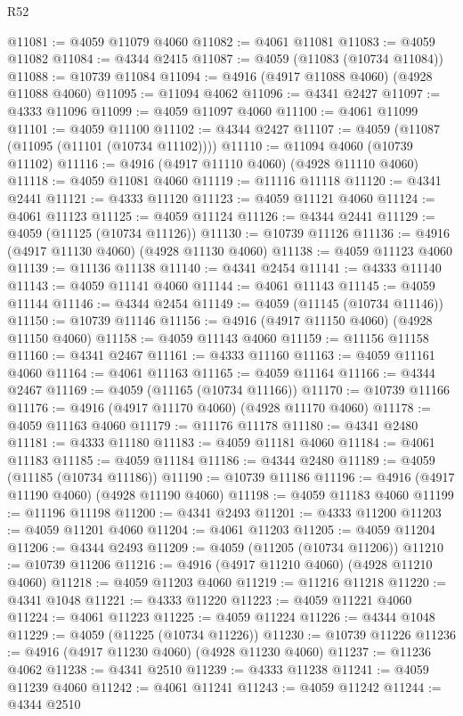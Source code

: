 \begin{lexlean}{R52}
\begin{coremodule}
@11081 := @4059 @11079 @4060
@11082 := @4061 @11081
@11083 := @4059 @11082
@11084 := @4344 @2415
@11087 := @4059 (@11083 (@10734 @11084))
@11088 := @10739 @11084
@11094 := @4916 (@4917 @11088 @4060) (@4928 @11088 @4060)
@11095 := @11094 @4062
@11096 := @4341 @2427
@11097 := @4333 @11096
@11099 := @4059 @11097 @4060
@11100 := @4061 @11099
@11101 := @4059 @11100
@11102 := @4344 @2427
@11107 := @4059 (@11087 (@11095 (@11101 (@10734 @11102))))
@11110 := @11094 @4060 (@10739 @11102)
@11116 := @4916 (@4917 @11110 @4060) (@4928 @11110 @4060)
@11118 := @4059 @11081 @4060
@11119 := @11116 @11118
@11120 := @4341 @2441
@11121 := @4333 @11120
@11123 := @4059 @11121 @4060
@11124 := @4061 @11123
@11125 := @4059 @11124
@11126 := @4344 @2441
@11129 := @4059 (@11125 (@10734 @11126))
@11130 := @10739 @11126
@11136 := @4916 (@4917 @11130 @4060) (@4928 @11130 @4060)
@11138 := @4059 @11123 @4060
@11139 := @11136 @11138
@11140 := @4341 @2454
@11141 := @4333 @11140
@11143 := @4059 @11141 @4060
@11144 := @4061 @11143
@11145 := @4059 @11144
@11146 := @4344 @2454
@11149 := @4059 (@11145 (@10734 @11146))
@11150 := @10739 @11146
@11156 := @4916 (@4917 @11150 @4060) (@4928 @11150 @4060)
@11158 := @4059 @11143 @4060
@11159 := @11156 @11158
@11160 := @4341 @2467
@11161 := @4333 @11160
@11163 := @4059 @11161 @4060
@11164 := @4061 @11163
@11165 := @4059 @11164
@11166 := @4344 @2467
@11169 := @4059 (@11165 (@10734 @11166))
@11170 := @10739 @11166
@11176 := @4916 (@4917 @11170 @4060) (@4928 @11170 @4060)
@11178 := @4059 @11163 @4060
@11179 := @11176 @11178
@11180 := @4341 @2480
@11181 := @4333 @11180
@11183 := @4059 @11181 @4060
@11184 := @4061 @11183
@11185 := @4059 @11184
@11186 := @4344 @2480
@11189 := @4059 (@11185 (@10734 @11186))
@11190 := @10739 @11186
@11196 := @4916 (@4917 @11190 @4060) (@4928 @11190 @4060)
@11198 := @4059 @11183 @4060
@11199 := @11196 @11198
@11200 := @4341 @2493
@11201 := @4333 @11200
@11203 := @4059 @11201 @4060
@11204 := @4061 @11203
@11205 := @4059 @11204
@11206 := @4344 @2493
@11209 := @4059 (@11205 (@10734 @11206))
@11210 := @10739 @11206
@11216 := @4916 (@4917 @11210 @4060) (@4928 @11210 @4060)
@11218 := @4059 @11203 @4060
@11219 := @11216 @11218
@11220 := @4341 @1048
@11221 := @4333 @11220
@11223 := @4059 @11221 @4060
@11224 := @4061 @11223
@11225 := @4059 @11224
@11226 := @4344 @1048
@11229 := @4059 (@11225 (@10734 @11226))
@11230 := @10739 @11226
@11236 := @4916 (@4917 @11230 @4060) (@4928 @11230 @4060)
@11237 := @11236 @4062
@11238 := @4341 @2510
@11239 := @4333 @11238
@11241 := @4059 @11239 @4060
@11242 := @4061 @11241
@11243 := @4059 @11242
@11244 := @4344 @2510

\end{coremodule}
\end{lexlean}
